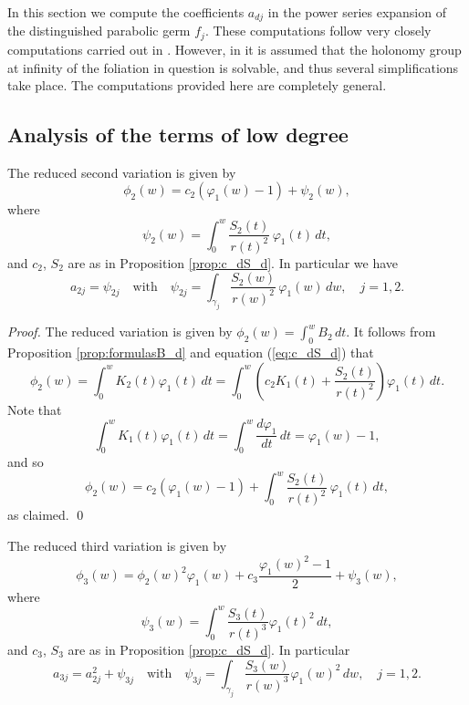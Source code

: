 


In this section we compute the coefficients $a_{dj}$ in the power series expansion of the distinguished parabolic germ $f_j$. These computations follow very closely computations carried out in \cite{Pyartli2006}. However, in \cite{Pyartli2006} it is assumed that the holonomy group at infinity of the foliation in question is solvable, and thus several simplifications take place. The computations provided here are completely general.



\subsection{Analysis of the terms of low degree}


\begin{proposition}\label{prop:secondvar}
The reduced second variation is given by
\[ \phi_2(w)=c_2(\varphi_1(w)-1)+\psi_2(w), \]
where 
\[ \psi_2(w)=\int_{0}^{w}\frac{S_2(t)}{r(t)^2}\,\varphi_1(t)\,dt, \]
and $c_2$, $S_2$ are as in Proposition \textnormal{\ref{prop:c_dS_d}}. In particular we have
\[ a_{2j}=\psi_{2j} \quad\text{with}\quad \psi_{2j}=\int_{\gamma_j}\frac{S_2(w)}{r(w)^2}\,\varphi_1(w)\,dw, \quad j=1,2. \]
\end{proposition}

\begin{proof}
The reduced variation is given by $\phi_2(w)=\int_0^wB_2\,dt$. It follows from Proposition \ref{prop:formulasB_d} and equation (\ref{eq:c_dS_d}) that
\[ \phi_2(w)=\int_{0}^{w} K_2(t)\varphi_1(t)\,dt=\int_{0}^{w} \left(c_2K_1(t)+\frac{S_2(t)}{r(t)^2}\right)\varphi_1(t)\,dt. \]
Note that
\[ \int_{0}^{w}K_1(t)\varphi_1(t)\,dt=\int_0^w\frac{d\varphi_1}{dt}\,dt=\varphi_1(w)-1, \]
and so
\[ \phi_2(w)=c_2(\varphi_1(w)-1)+\int_{0}^{w}\frac{S_2(t)}{r(t)^2}\,\varphi_1(t)\,dt, \]
as claimed. \qed
\end{proof}

\begin{proposition}\label{prop:thirdvar}
The reduced third variation is given by
\[ \phi_3(w)=\phi_2(w)^2\varphi_1(w)+c_3\frac{\varphi_1(w)^2-1}{2}+\psi_3(w), \]
where 
\[ \psi_3(w)=\int_0^w\frac{S_3(t)}{r(t)^3}\varphi_1(t)^2\,dt, \]
and $c_3$, $S_3$ are as in Proposition \textnormal{\ref{prop:c_dS_d}}. In particular 
\[ a_{3j}=a_{2j}^2+\psi_{3j} \quad\text{with}\quad \psi_{3j}=\int_{\gamma_j}\frac{S_3(w)}{r(w)^3}\varphi_1(w)^2\,dw, \quad j=1,2. \]
\end{proposition}

